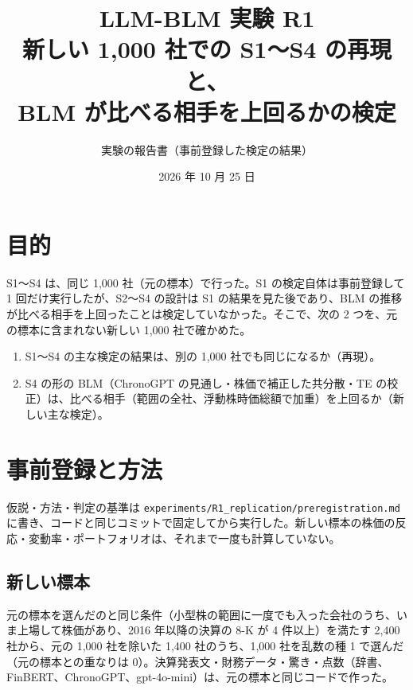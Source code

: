 \documentclass[xelatex,ja=standard,jafont=haranoaji,a4paper,10pt,openany]{bxjsreport}
\title{LLM-BLM 実験 R1\\[6pt]
  \large 新しい 1,000 社での S1〜S4 の再現と、\\BLM が比べる相手を上回るかの検定}
\author{実験の報告書（事前登録した検定の結果）}
\date{2026 年 10 月 25 日}
\newcommand{\code}[1]{\texttt{#1}}
\begin{document}
\maketitle



\setcounter{tocdepth}{1}
{\small\tableofcontents}

\chapter{目的}\label{ch:purpose}

S1〜S4 は、同じ 1,000 社（元の標本）で行った。S1 の検定自体は事前登録して 1 回だけ実行したが、S2〜S4 の設計は S1 の結果を見た後であり、BLM の推移が比べる相手を上回ったことは検定していなかった。そこで、次の 2 つを、元の標本に含まれない新しい 1,000 社で確かめた。

\begin{keybox}[問い]
\begin{enumerate}
\item S1〜S4 の主な検定の結果は、別の 1,000 社でも同じになるか（再現）。
\item S4 の形の BLM（ChronoGPT の見通し・株価で補正した共分散・TE の校正）は、比べる相手（範囲の全社、浮動株時価総額で加重）を上回るか（新しい主な検定）。
\end{enumerate}
\end{keybox}

\chapter{事前登録と方法}\label{ch:method}

仮説・方法・判定の基準は \code{experiments/R1\_replication/preregistration.md} に書き、コードと同じコミットで固定してから実行した。新しい標本の株価の反応・変動率・ポートフォリオは、それまで一度も計算していない。

\section{新しい標本}

元の標本を選んだのと同じ条件（小型株の範囲に一度でも入った会社のうち、いま上場して株価があり、2016 年以降の決算の 8-K が 4 件以上）を満たす 2,400 社から、元の 1,000 社を除いた 1,400 社のうち、1,000 社を乱数の種 1 で選んだ（元の標本との重なりは 0）。決算発表文・財務データ・驚き・点数（辞書、FinBERT、ChronoGPT、gpt-4o-mini）は、元の標本と同じコードで作った。
\end{document}
